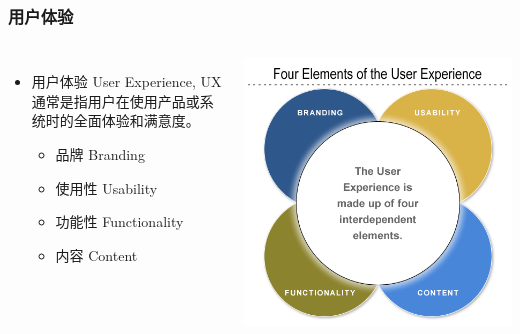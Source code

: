 \documentclass{beamer}
\begin{document}

\begin{frame}
	\frametitle{用户体验}
	\beamertemplatetransparentcovereddynamicmedium
	\begin{columns}
	\begin{itemize}[<+->]
		\item 用户体验 User Experience, UX\\{\tiny 通常是指用户在使用产品或系统时的全面体验和满意度。~\cite{dis20109241}}
		\begin{itemize}
			\item 品牌 Branding
			\item 使用性 Usability
			\item 功能性 Functionality
			\item 内容 Content
		\end{itemize}
	\end{itemize}
	\includegraphics[width=\textwidth]{images/user-experience.png}
	\end{columns}
\end{frame}
\end{document}
